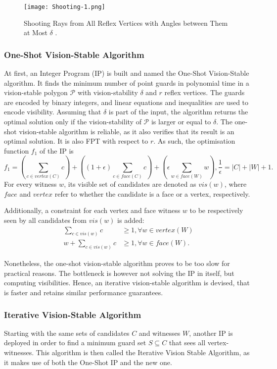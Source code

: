 \begin{figure}[h!]
    \centering
    \texttt{[image: Shooting-1.png]}
    \caption{Shooting Rays from All Reflex Vertices with Angles between Them at Most $\delta$ \cite{DBLP:journals/corr/abs-2007-06920}.}
    \label{fig:rays}
\end{figure}


\subsubsection{One-Shot Vision-Stable Algorithm}
At first, an Integer Program (IP) is built and named the One-Shot Vision-Stable algorithm. It finds the minimum number of point guards in polynomial time in a vision-stable polygon $\mathcal P$ with  vision-stability $\delta$ and $r$ reflex vertices. The guards are encoded by binary integers, and linear equations and inequalities are used to encode visibility. Assuming that $\delta$ is part of the input, the algorithm returns the optimal solution only if the vision-stability of $\mathcal P$ is larger or equal to $\delta$. The one-shot vision-stable algorithm is reliable, as it also verifies that its result is an optimal solution. It is also FPT with respect to $r$. As such, the optimisation function $f_1$ of the IP is $$f_1 = (\sum_{c \in vertex(C)} c) + ((1 + \epsilon)\sum_{c \in face(C)} c) + (\epsilon \sum_{w \in face(W)} w), \frac 1 \epsilon = |C| + |W| + 1.$$ For every witness $w$, its visible set of candidates are denoted as $vis(w)$, where $face$ and $vertex$ refer to whether the candidate is a face or a vertex, respectively.

Additionally, a constraint for each vertex and face witness $w$ to be respectively seen by all candidates from $vis(w)$ is added:
	\begin{align*}
		\sum_{c \in vis(w)} c &\geq 1, \forall w \in vertex(W) \\
		w + \sum_{c \in vis(w)} c &\geq 1, \forall w \in face(W).
	\end{align*}

Nonetheless, the one-shot vision-stable algorithm proves to be too slow for practical reasons. The bottleneck is however not solving the IP in itself, but computing visibilities. Hence, an iterative vision-stable algorithm is devised, that is faster and retains similar performance guarantees. 

\subsubsection{Iterative Vision-Stable Algorithm}
Starting with the same sets of candidates $C$ and witnesses $W$, another IP is deployed in order to find a minimum guard set $S \subseteq C$ that sees all vertex-witnesses. This algorithm is then called the Iterative Vision Stable Algorithm, as it makes use of both the One-Shot IP and the new one. 

